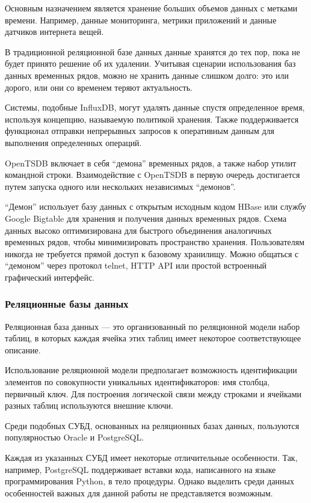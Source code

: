 Основным назначением является хранение больших объемов данных с метками времени. Например, данные мониторинга, метрики приложений и данные датчиков интернета вещей.

В традиционной реляционной базе данных данные хранятся до тех пор, пока не будет принято решение об их удалении. Учитывая сценарии использования баз данных временных рядов, можно не хранить данные слишком долго: это или дорого, или они со временем теряют актуальность. \cite{ryadi}

Системы, подобные InfluxDB, могут удалять данные спустя определенное время, используя концепцию, называемую политикой хранения. Также поддерживается функционал отправки непрерывных запросов к оперативным данным для выполнения определенных операций. \cite{ryadi}

OpenTSDB включает в себя ``демона'' временных рядов, а также набор утилит командной строки. Взаимодействие с OpenTSDB в первую очередь достигается путем запуска одного или нескольких независимых ``демонов''.

``Демон'' использует базу данных с открытым исходным кодом HBase или службу Google Bigtable для хранения и получения данных временных рядов. Схема данных высоко оптимизирована для быстрого объединения аналогичных временных рядов, чтобы минимизировать пространство хранения. Пользователям никогда не требуется прямой доступ к базовому хранилищу. Можно общаться с ``демоном'' через протокол telnet, HTTP API или простой встроенный графический интерфейс.

\subsubsection{Реляционные базы данных}
Реляционная база данных --- это организованный по реляционной модели набор таблиц, в которых каждая ячейка этих таблиц имеет некоторое соответствующее описание. \cite{relationki}

Использование реляционной модели предполагает возможность идентификации элементов по совокупности уникальных идентификаторов: имя столбца, первичный ключ. Для построения логической связи между строками и ячейками разных таблиц используются внешние ключи. \cite{relationki}

Среди подобных СУБД, основанных на реляционных базах данных, пользуются популярностью Oracle и PostgreSQL.

Каждая из указанных СУБД имеет некоторые отличительные особенности. Так, например, PostgreSQL поддерживает вставки кода, написанного на языке программирования Python, в тело процедуры. Однако выделить среди данных особенностей важных для данной работы не представляется возможным.

